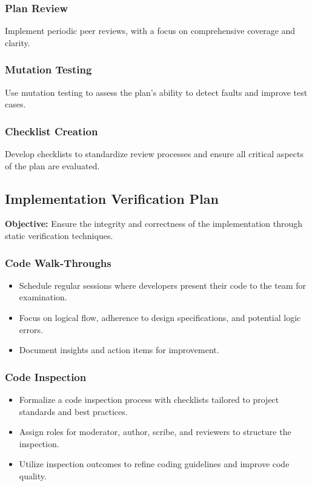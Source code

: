 \documentclass[12pt, titlepage]{article}
\begin{document}
\subsubsection{Plan Review}
Implement periodic peer reviews, with a focus on comprehensive coverage and clarity.

\subsubsection{Mutation Testing}
Use mutation testing to assess the plan's ability to detect faults and improve test cases.

\subsubsection{Checklist Creation}
Develop checklists to standardize review processes and ensure all critical aspects of the plan are evaluated.

\subsection{Implementation Verification Plan}

\noindent \textbf{Objective:} Ensure the integrity and correctness of the implementation through static verification techniques.

\subsubsection{Code Walk-Throughs}
\begin{itemize}
  \item Schedule regular sessions where developers present their code to the team for examination.
  \item Focus on logical flow, adherence to design specifications, and potential logic errors.
  \item Document insights and action items for improvement.
\end{itemize}

\subsubsection{Code Inspection}
\begin{itemize}
  \item Formalize a code inspection process with checklists tailored to project standards and best practices.
  \item Assign roles for moderator, author, scribe, and reviewers to structure the inspection.
  \item Utilize inspection outcomes to refine coding guidelines and improve code quality.
\end{itemize}
\end{document}

